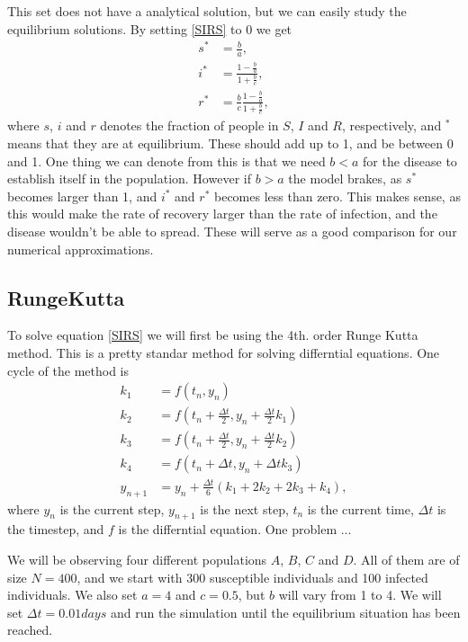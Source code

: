 \documentclass[a4paper]{article}
\let\Oldsubsection\subsection
\renewcommand{\subsection}{\FloatBarrier\Oldsubsection}
\begin{document}
This set does not have a analytical solution, but we can easily study the equilibrium solutions. By setting \ref{SIRS} to 0 we get 
\begin{align} 
s ^ { * } & = \frac { b } { a }, \\ 
i ^ { * } & = \frac { 1 - \frac { b } { a } } { 1 + \frac { b } { c } }, \\ 
r ^ { * } & = \frac { b } { c } \frac { 1 - \frac { b } { a } } { 1 +  \frac{b}{c} }, \label{SIRS_eq}
\end{align}
where $s$, $i$ and $r$ denotes the fraction of people in $S$, $I$ and $R$, respectively, and $^*$ means that they are at equilibrium. These should add up to 1, and be between 0 and 1. 
One thing we can denote from this is that we need $b < a$ for the disease to establish itself in the population. However if $b>a$ the model brakes, as $s^*$ becomes larger than 1, and $i^*$ and $r^*$ becomes less than zero. This makes sense, as this would make the rate of recovery larger than the rate of infection, and the disease wouldn't be able to spread. 
These will serve as a good comparison for our numerical approximations. 


\subsection{RungeKutta}
To solve equation \ref{SIRS} we will first be using the 4th. order Runge Kutta method. This is a pretty standar method for solving differntial equations. One cycle of the method is
\begin{align}
k_1 &= f(t_n,y_n) \\
k_2 &= f(t_n + \frac{\Delta t}{2},y_n + \frac{\Delta t}{2} k_1) \\
k_3 &= f(t_n + \frac{\Delta t}{2},y_n + \frac{\Delta t}{2} k_2) \\
k_4 &= f(t_n + \Delta t, y_n + \Delta t k_3) \\
y_{n+1} &= y_n + \frac{\Delta t}{6} \left( k_1 + 2k_2 + 2k_3 + k_4 \right),
\end{align}
where $y_n$ is the current step, $y_{n+1}$ is the next step, $t_n$ is the current time, $\Delta t$ is the timestep, and $f$ is the differntial equation. 
One problem ...

We will be observing four different populations $A$, $B$, $C$ and $D$. All of them are of size $N = 400$, and we start with 300 susceptible individuals and 100 infected individuals. We also set $a=4$ and $c=0.5$, but $b$ will vary from 1 to 4. We will set $\Delta t = 0.01 days$ and run the simulation until the equilibrium situation has been reached. 
\end{document}
